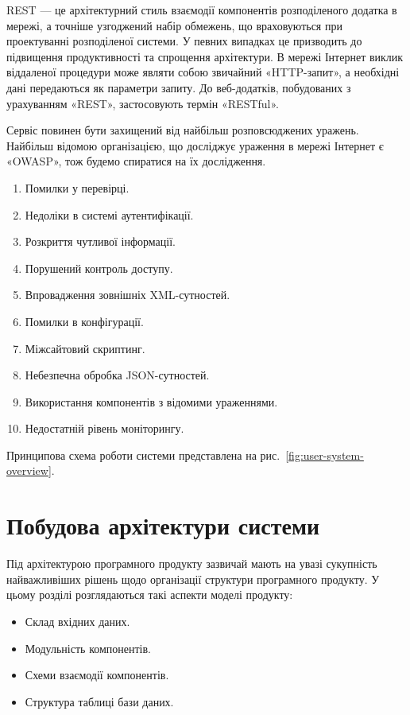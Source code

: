 REST — це архітектурний стиль взаємодії компонентів розподіленого додатка в мережі,
а точніше узгоджений набір обмежень, що враховуються при проектуванні розподіленої системи.
У певних випадках це призводить до підвищення продуктивності та спрощення архітектури.
В мережі Інтернет виклик віддаленої процедури може являти собою звичайний «HTTP-запит»,
а необхідні дані передаються як параметри запиту.
До веб-додатків, побудованих з урахуванням «REST», застосовують термін «RESTful».

Сервіс повинен бути захищений від найбільш розповсюджених уражень.
Найбільш відомою організацією, що досліджує ураження в мережі Інтернет є «OWASP»,
тож будемо спиратися на їх дослідження.

\begin{enumerate}
  \item Помилки у перевірці.
  \item Недоліки в системі аутентифікації.
  \item Розкриття чутливої інформації.
  \item Порушений контроль доступу.
  \item Впровадження зовнішніх XML-сутностей.
  \item Помилки в конфігурації.
  \item Міжсайтовий скриптинг.
  \item Небезпечна обробка JSON-сутностей.
  \item Використання компонентів з відомими ураженнями.
  \item Недостатній рівень моніторингу.
\end{enumerate}

Принципова схема роботи системи представлена на рис.~\ref{fig:user-system-overview}.

\section{Побудова архітектури системи}

Під архітектурою програмного продукту зазвичай мають на увазі
сукупність найважливіших рішень щодо організації структури програмного
продукту.
У цьому розділі розглядаються такі аспекти моделі продукту:

\begin{itemize}
  \item Склад вхідних даних.
  \item Модульність компонентів.
  \item Схеми взаємодії компонентів.
  \item Структура таблиці бази даних.
\end{itemize}

